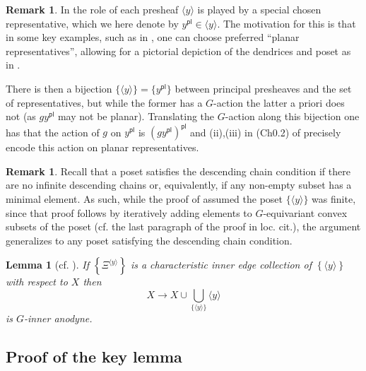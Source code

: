 \documentclass[a4paper,10pt]{article}%
\numberwithin{equation}{section}
\numberwithin{figure}{section}
\newtheorem{lemma}[equation]{Lemma}%
\theoremstyle{definition} %
\newtheorem{remark}[equation]{Remark}%
\newcommand{\1}{\ensuremath{\mathbbm 1}}%
\begin{document}
\begin{remark}\label{CH02 REM}
	In \cite[Rem. 3.7]{BP_edss} the role of each presheaf 
	$\langle y \rangle$ is played by a special chosen representative,
	which we here denote by
	$y^{\mathsf{pl}} \in \langle y \rangle$. 
	The motivation for this is that in some key examples, such as in \cite[Ex. 3.9]{BP_edss}, one can choose preferred ``planar representatives'',
	allowing for a pictorial depiction of the dendrices and poset as in
	\cite[Fig. 3.1]{BP_edss}. 
	
	There is then a bijection $\{\langle y \rangle\} = \{ y^{\mathsf{pl}}\}$ between principal presheaves and the set of representatives, but while the former has a $G$-action the latter a priori does not (as $gy^{\mathsf{pl}}$ may not be planar). Translating the $G$-action along this bijection one has that the action of $g$ on $y^{\mathsf{pl}}$ is
	$(g y^{\mathsf{pl}})^{\mathsf{pl}}$ and (ii),(iii) in 
	(Ch0.2) of \cite[Rem. 3.7]{BP_edss} precisely 
	encode this action on planar representatives.
\end{remark}

\begin{remark}\label{DCC REM}
	Recall that a poset satisfies the descending chain condition if there are no infinite descending chains or, equivalently, if any non-empty subset has a minimal element. As such, while the proof of \cite[Lemma 3.4]{BP_edss}
	assumed the poset $\{\langle y \rangle\}$ was finite,
	since that proof follows by iteratively adding elements to $G$-equivariant convex subsets of the poset (cf. the last paragraph of the proof in loc. cit.), the argument generalizes to any poset satisfying the descending chain condition.
\end{remark}

\begin{lemma}[{cf. \cite[Lemma 3.4]{BP_edss}}]
	\label{CHAREDGE LEM}
	If
	$
	\left\{ \Xi^{\langle y \rangle} \right \} 
	$
	is a \emph{characteristic inner edge collection} 
	of $\left\{ \langle y \rangle \right\}$ with respect to $X$ then
	\begin{equation}\label{CHAREDGE EQ}
	X \to X \cup \bigcup_{\{\langle y \rangle\}} \langle y \rangle
	\end{equation}
	is $G$-inner anodyne.
\end{lemma}




\subsection{Proof of the key lemma}
\end{document}
